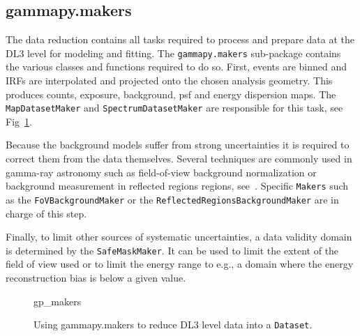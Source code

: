 \subsection{gammapy.makers}
\label{ssec:gammapy-makers}

The data reduction contains all tasks required to process and prepare data at the DL3
level for modeling and fitting. The \texttt{gammapy.makers} sub-package contains the various
classes and functions required to do so. First, events are binned and IRFs are interpolated and
projected onto the chosen analysis geometry. This produces counts, exposure, background, psf
and energy dispersion maps. The \texttt{MapDatasetMaker} and \texttt{SpectrumDatasetMaker}
are responsible for this task, see Fig~\ref{ig*:minted:gp_makers}.

Because the background models suffer from strong uncertainties it is required to correct
them from the data themselves. Several techniques are commonly used in gamma-ray astronomy
such as field-of-view background normalization or background measurement in reflected regions
regions, see~\cite{Berge07}. Specific \texttt{Makers} such as the \texttt{FoVBackgroundMaker}
or the \texttt{ReflectedRegionsBackgroundMaker} are in charge of this step.

Finally, to limit other sources of systematic uncertainties, a data validity domain is
determined by the \texttt{SafeMaskMaker}. It can be used to limit the extent of the field
of view used or to limit the energy range to e.g., a domain where the energy reconstruction
bias is below a given value.

\begin{figure}
	{gp_makers}

	\caption{Using gammapy.makers to reduce DL3 level data into a \texttt{Dataset}.}
	\label{ig*:minted:gp_makers}
\end{figure}
